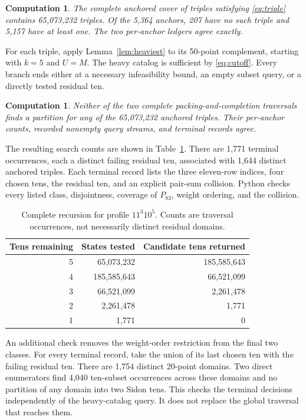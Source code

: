 \documentclass[11pt]{article}
\newtheorem{computation}[theorem]{Computation}
\begin{document}
\begin{computation}\label{comp:triples}
The complete anchored cover of triples satisfying \eqref{eq:triple}
contains 65,073,232 triples. Of the 5,364 anchors, 207 have no such triple
and 5,157 have at least one. The two per-anchor ledgers agree exactly.
\end{computation}

For each triple, apply Lemma~\ref{lem:heaviest} to its 50-point complement,
starting with $k=5$ and $U=M$. The heavy catalog is sufficient by
\eqref{eq:cutoff}. Every branch ends either at a necessary infeasibility
bound, an empty subset query, or a directly tested residual ten.

\begin{computation}\label{comp:balanced}
Neither of the two complete packing-and-completion traversals finds a
partition for any of the 65,073,232 anchored triples. Their per-anchor
counts, recorded nonempty query streams, and terminal records agree.
\end{computation}

The resulting search counts are shown in Table~\ref{tab:balanced}. There
are 1,771 terminal occurrences, each a distinct failing residual ten,
associated with 1,644 distinct anchored triples. Each terminal record
lists the three eleven-row indices, four chosen tens, the residual ten,
and an explicit pair-sum collision. Python checks every listed class,
disjointness, coverage of $P_{83}$, weight ordering, and the collision.

\begin{table}[ht]
\centering
\begin{tabular}{rrr}
\toprule
Tens remaining&States tested&Candidate tens returned\\
\midrule
5&65,073,232&185,585,643\\
4&185,585,643&66,521,099\\
3&66,521,099&2,261,478\\
2&2,261,478&1,771\\
1&1,771&0\\
\bottomrule
\end{tabular}
\caption{Complete recursion for profile $11^3 10^5$. Counts are traversal
occurrences, not necessarily distinct residual domains.}\label{tab:balanced}
\end{table}

An additional check removes the weight-order restriction from the final
two classes. For every terminal record, take the union of its last chosen
ten with the failing residual ten. There are 1,754 distinct 20-point
domains. Two direct enumerators find 4,040 ten-subset occurrences across
these domains and no partition of any domain into two Sidon tens.
This checks the terminal decisions independently of the heavy-catalog
query. It does not replace the global traversal that reaches them.
\end{document}
